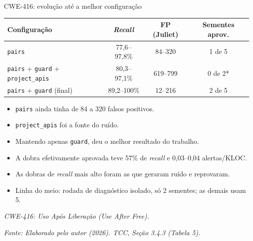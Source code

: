 \documentclass[
    aspectratio=169,
    12pt,
    brazil
]{beamer}
\newcommand{\fonte}[1]{{\tiny\itshape Fonte: #1\par}}
\begin{document}
\begin{frame}{CWE-416: evolução até a melhor configuração}
  \begin{table}
  \small
  \begin{tabular}{lccc}
  \toprule
  \textbf{Configuração} & \textbf{\textit{Recall}} & \textbf{FP (Juliet)} & \textbf{Sementes aprov.} \\
  \midrule
  \texttt{pairs} & 77,6--97,8\% & 84--320 & 1 de 5 \\
  \texttt{pairs} + \texttt{guard} + \texttt{project\_apis} & 80,3--97,1\% & 619--799 & 0 de 2* \\
  \texttt{pairs} + \texttt{guard} (final) & 89,2--100\% & 12--216 & 2 de 5 \\
  \bottomrule
  \end{tabular}
  \end{table}
  \begin{itemize}
    \footnotesize
    \item \texttt{pairs} ainda tinha de 84 a 320 falsos positivos.
    \item \texttt{project\_apis} foi a fonte do ruído.
    \item Mantendo apenas \texttt{guard}, deu o melhor resultado do trabalho.
    \item A dobra efetivamente aprovada teve 57\% de \textit{recall} e 0,03--0,04 alertas/KLOC.
    \item As dobras de \textit{recall} mais alto foram as que geraram ruído e reprovaram.
    \item[] \scriptsize *Linha do meio: rodada de diagnóstico isolado, só 2 sementes; as demais usam 5.
  \end{itemize}
  \vspace{0.2cm}
  \vfill
  {\tiny\itshape CWE-416: Uso Após Liberação (\textit{Use After Free}).\par}
  \fonte{Elaborado pelo autor (2026). TCC, Seção 3.4.3 (Tabela 5).}
\end{frame}
\end{document}

